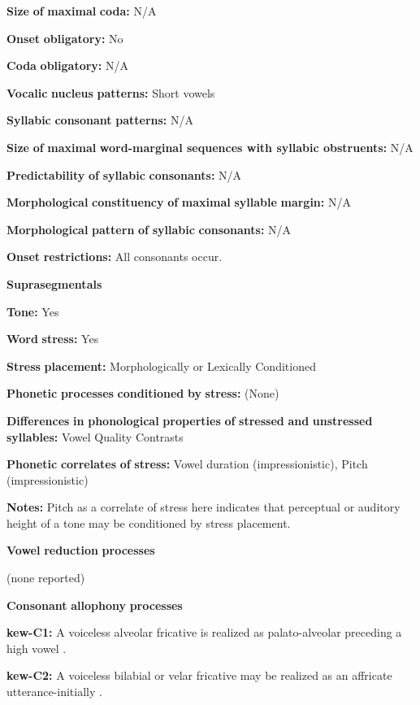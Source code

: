 \begin{styleBody}
\textbf{Size} \textbf{of} \textbf{maximal} \textbf{coda:} N/A

\textbf{Onset} \textbf{obligatory:} No

\textbf{Coda} \textbf{obligatory:} N/A

\textbf{Vocalic} \textbf{nucleus} \textbf{patterns:} Short vowels

\textbf{Syllabic} \textbf{consonant} \textbf{patterns:} N/A

\textbf{Size} \textbf{of} \textbf{maximal} \textbf{word{}-marginal sequences with syllabic obstruents:} N/A

\textbf{Predictability} \textbf{of} \textbf{syllabic} \textbf{consonants:} N/A

\textbf{Morphological} \textbf{constituency} \textbf{of} \textbf{maximal} \textbf{syllable} \textbf{margin:} N/A

\textbf{Morphological} \textbf{pattern} \textbf{of} \textbf{syllabic} \textbf{consonants:} N/A

\textbf{Onset} \textbf{restrictions:} All consonants occur.

\textbf{Suprasegmentals}

\textbf{Tone:} Yes

\textbf{Word} \textbf{stress:} Yes

\textbf{Stress} \textbf{placement:} Morphologically or Lexically Conditioned

\textbf{Phonetic} \textbf{processes} \textbf{conditioned} \textbf{by} \textbf{stress:} (None)

\textbf{Differences} \textbf{in} \textbf{phonological} \textbf{properties} \textbf{of} \textbf{stressed} \textbf{and} \textbf{unstressed} \textbf{syllables:} Vowel Quality Contrasts

\textbf{Phonetic} \textbf{correlates} \textbf{of} \textbf{stress:} Vowel duration (impressionistic), Pitch (impressionistic)

\textbf{Notes:} Pitch as a correlate of stress here indicates that perceptual or auditory height of a tone may be conditioned by stress placement.

\textbf{Vowel} \textbf{reduction} \textbf{processes}

(none reported)

\textbf{Consonant} \textbf{allophony} \textbf{processes}

\textbf{kew-C1:} A voiceless alveolar fricative is realized as palato-alveolar preceding a high vowel \citep[24]{Franklin1971}.

\textbf{kew-C2:} A voiceless bilabial or velar fricative may be realized as an affricate utterance-initially \citep[24]{Franklin1971}.


\end{styleBody}
